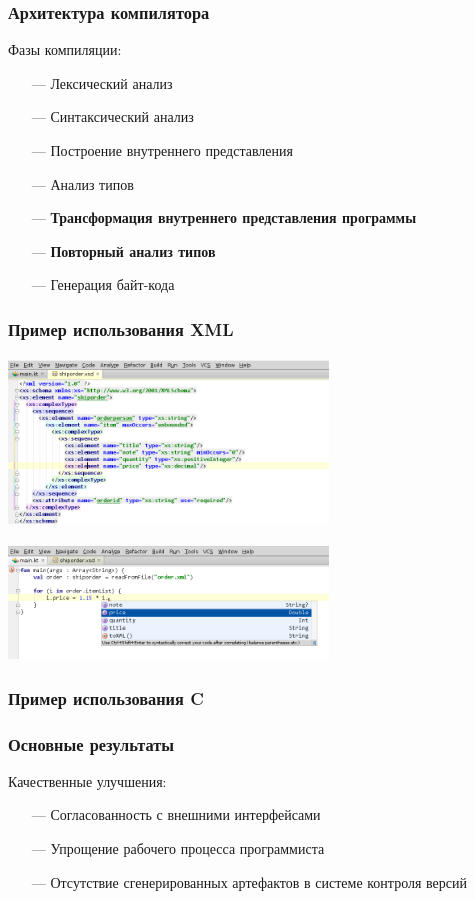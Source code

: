 \documentclass[14pt]{beamer}
\begin{document}
\begin{frame}\frametitle{Архитектура компилятора}
\linespread{0.9}
\begin{small}
    Фазы компиляции:
    \begin{itemize}
        \item[---] Лексический анализ
        \item[---] Синтаксический анализ
        \item[---] Построение внутреннего представления
        \item[---] Анализ типов
        \item[---] \textbf{Трансформация внутреннего представления программы}
        \item[---] \textbf{Повторный анализ типов}
        \item[---] Генерация байт-кода
    \end{itemize}
\end{small}
\linespread{1.2}
\end{frame}

\begin{frame}\frametitle{Пример использования XML}
\begin{center}
    \includegraphics[height=4.5cm,width=8.48cm]{shiporder}

    \includegraphics[height=3cm,width=8.48cm]{completion}
\end{center}
\end{frame}

\begin{frame}\frametitle{Пример использования C}
\end{frame}

\begin{frame}\frametitle{Основные результаты}
    Качественные улучшения:
    \begin{itemize}
        \item[---] Согласованность с внешними интерфейсами
        \item[---] Упрощение рабочего процесса программиста
        \item[---] Отсутствие сгенерированных артефактов в системе контроля версий
    \end{itemize}
\end{frame}
\end{document}
